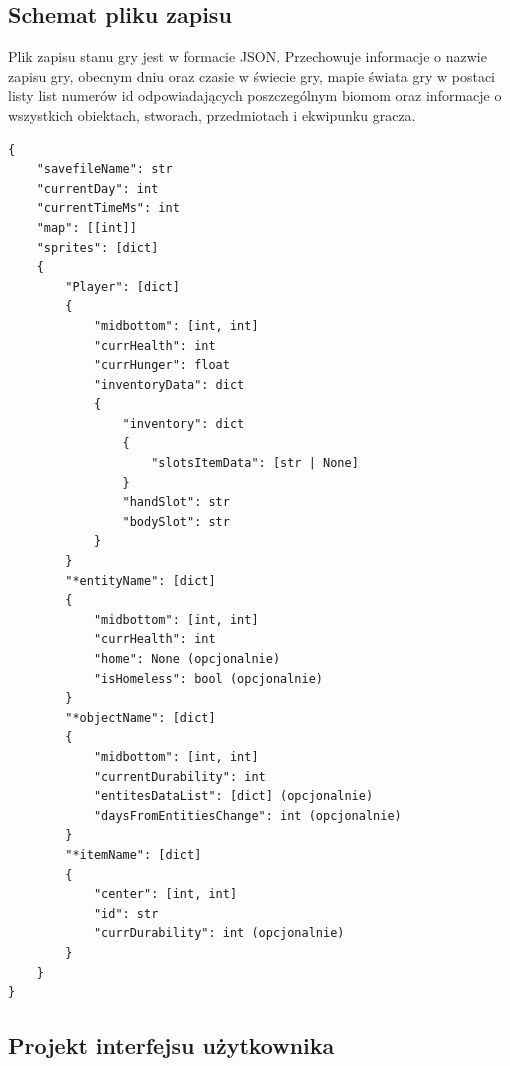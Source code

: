 \documentclass{article}
\begin{document}
\subsection{Schemat pliku zapisu}
Plik zapisu stanu gry jest w formacie JSON. Przechowuje informacje o nazwie zapisu gry, obecnym dniu oraz czasie w świecie gry, mapie świata gry w postaci listy list numerów id odpowiadających poszczególnym biomom oraz informacje o wszystkich obiektach, stworach, przedmiotach i ekwipunku gracza.\\
\begin{center}
    \begin{lstlisting}[language=jsonSchema]
{
    "savefileName": str
    "currentDay": int
    "currentTimeMs": int
    "map": [[int]]
    "sprites": [dict]
    {
        "Player": [dict]
        {
            "midbottom": [int, int]
            "currHealth": int
            "currHunger": float
            "inventoryData": dict
            {
                "inventory": dict
                {
                    "slotsItemData": [str | None]
                }
                "handSlot": str
                "bodySlot": str
            }
        }
        "*entityName": [dict]
        {
            "midbottom": [int, int]
            "currHealth": int
            "home": None (opcjonalnie)
            "isHomeless": bool (opcjonalnie)
        }
        "*objectName": [dict]
        {
            "midbottom": [int, int]
            "currentDurability": int
            "entitesDataList": [dict] (opcjonalnie)
            "daysFromEntitiesChange": int (opcjonalnie)
        }
        "*itemName": [dict]
        {
            "center": [int, int]
            "id": str
            "currDurability": int (opcjonalnie)
        }
    }
}
    \end{lstlisting}
\end{center}
\subsection{Projekt interfejsu użytkownika}
\end{document}
